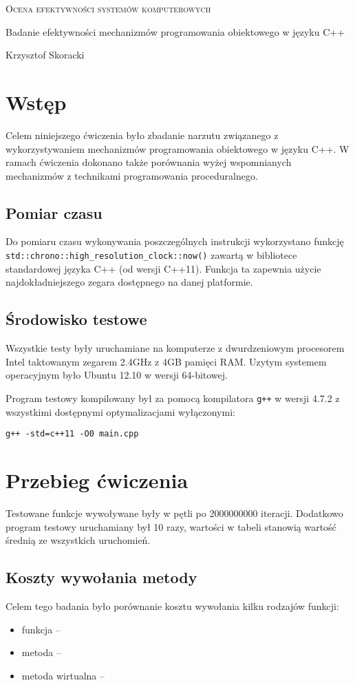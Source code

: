 \documentclass{article}
\begin{document}
\renewcommand*{\tablename}{Tab.}
\begin{center}
\textsc{\huge Ocena efektywności systemów komputerowych}


\vspace{0.8cm}
{\Large Badanie efektywności mechanizmów programowania obiektowego w języku C++}
\vspace{0.8cm}

Krzysztof Skoracki
\vspace{1cm}
\end{center}
\section{Wstęp}
Celem niniejszego ćwiczenia było zbadanie narzutu związanego z wykorzystywaniem mechanizmów programowania obiektowego w języku C++. W ramach ćwiczenia dokonano także porównania wyżej wspomnianych mechanizmów z technikami programowania proceduralnego.

\subsection{Pomiar czasu}
Do pomiaru czasu wykonywania poszczególnych instrukcji wykorzystano funkcję \texttt{std::chrono::high\_resolution\_clock::now()} zawartą w bibliotece standardowej języka C++ (od wersji C++11). Funkcja ta zapewnia użycie najdokładniejszego zegara dostępnego na danej platformie.

\subsection{Środowisko testowe}
Wszystkie testy były uruchamiane na komputerze z dwurdzeniowym procesorem Intel taktowanym zegarem 2.4GHz z 4GB pamięci RAM. Uzytym systemem operacyjnym było Ubuntu 12.10 w wersji 64-bitowej.

Program testowy kompilowany był za pomocą kompilatora \texttt{g++} w wersji 4.7.2 z wszystkimi dostępnymi optymalizacjami wyłączonymi:

\texttt{g++ -std=c++11 -O0 main.cpp}

\section{Przebieg ćwiczenia}
Testowane funkcje wywoływane były w pętli po 2000000000 iteracji. Dodatkowo program testowy uruchamiany był 10 razy, wartości w tabeli stanowią wartość średnią ze wszystkich uruchomień.
\subsection{Koszty wywołania metody}
Celem tego badania było porównanie kosztu wywołania kilku rodzajów funkcji:
\begin{itemize}
\item funkcja --
\item metoda --
\item metoda wirtualna --
\end{itemize}
\end{document}
